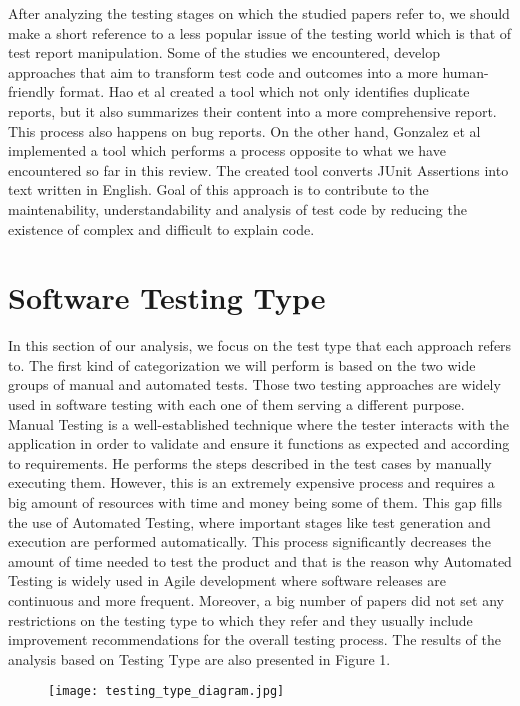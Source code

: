 After analyzing the testing stages on which the studied papers refer to, we should make a short reference to a less popular issue of the testing world which is that of test report manipulation. Some of the studies 
we encountered, develop approaches that aim to transform test code and outcomes into a more human-friendly format. Hao et al \cite{8811987} created a tool which not only identifies duplicate reports, but it also 
summarizes their content into a more comprehensive report. This process also happens on bug reports. On the other hand, Gonzalez et al \cite{10.1145/3283812.3283819} implemented a tool which performs a process 
opposite to what we have encountered so far in this review. The created tool converts JUnit Assertions into text written in English. Goal of this approach is to contribute to the maintenability, understandability 
and analysis of test code by reducing the existence of complex and difficult to explain code.

\section {Software Testing Type}
In this section of our analysis, we focus on the test type that each approach refers to. The first kind of categorization we will perform is based on the two wide groups of manual and automated tests. 
Those two testing approaches are widely used in software testing with each one of them serving a different purpose. Manual Testing is a well-established technique where the tester interacts with the 
application in order to validate and ensure it functions as expected and according to requirements. He performs the steps described in the test cases by manually executing them. However, this is an 
extremely expensive process and requires a big amount of resources with time and money being some of them. This gap fills the use of Automated Testing, where important stages like test generation and execution 
are performed automatically. This process significantly decreases the amount of time needed to test the product and that is the reason why Automated Testing is widely used in Agile development where 
software releases are continuous and more frequent. Moreover, a big number of papers did not set any restrictions on the testing type to which they refer and they usually include improvement recommendations for 
the overall testing process. The results of the analysis based on Testing Type are also presented in Figure 1.\\

\begin{figure}[h]
    \texttt{[image: testing\_type\_diagram.jpg]}
    \centering
\end{figure}

